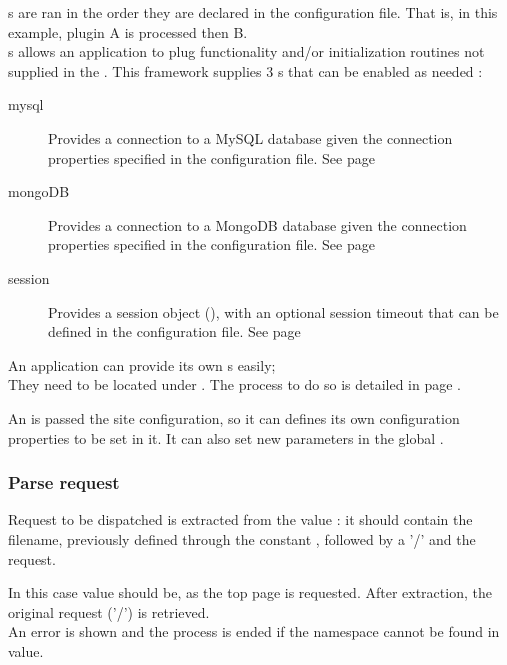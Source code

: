\documentclass[pdftex,12pt,a4paper]{article}
\begin{document}
s are ran in the order they are declared in the configuration file. That is, in this example, plugin A is processed then B. \\
s allows an application to plug functionality and/or initialization routines not supplied in the . This framework supplies 3 s that can be enabled as needed :
\begin{description}
	\item[mysql] Provides a connection to a MySQL database given the connection properties specified in the configuration file. See page \pageref{sec:mysql-init-plugin}
	\item[mongoDB] Provides a connection to a MongoDB database given the connection properties specified in the configuration file. See page \pageref{sec:mongodb-init-plugin}
	\item[session] Provides a session object (), with an optional session timeout that can be defined in the configuration file. See page \pageref{sec:session-init-plugin}
\end{description}

An application can provide its own s easily;\\
They need to be located under . The process to do so is detailed in page \pageref{sec:init-plugins}.

An  is passed the site configuration, so it can defines its own configuration properties to be set in it. It can also set new parameters in the global .

\subsubsection{Parse request}

Request to be dispatched is extracted from the  value : it should contain the  filename, previously defined through the constant , followed by a '/' and the request.

In this case  value should be, as the top page is requested. After extraction, the original request ('/') is retrieved. \\
An error is shown and the process is ended if the namespace cannot be found in  value.
\end{document}
